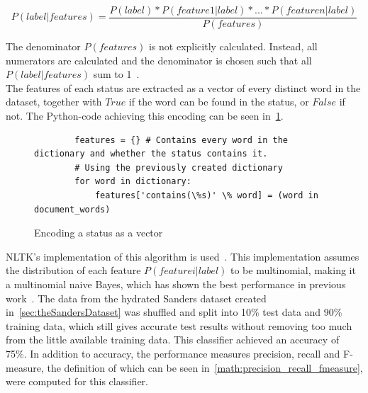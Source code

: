 \begin{equation}
    P(label|features) = \frac{P(label)*P(feature 1|label)*...*P(feature n|label)}{P(features)}
\end{equation}


The denominator $P(features)$ is not explicitly calculated.
Instead, all numerators are calculated and the denominator is chosen such that all $P(label|features)$ sum to 1~\cite{nltkDocs}.
\\
The features of each status are extracted as a vector of every distinct word in the dataset,
together with $True$ if the word can be found in the status, or $False$ if not.
The Python-code achieving this encoding can be seen in~\cref{code:extract_features}.

\begin{figure}
    \caption{Encoding a status as a vector}
    \label{code:extract_features}
    \begin{verbatim}
        features = {} # Contains every word in the dictionary and whether the status contains it.
        # Using the previously created dictionary
        for word in dictionary:
            features['contains(\%s)' \% word] = (word in document_words)
    \end{verbatim}
\end{figure}

NLTK's implementation of this algorithm is used~\cite{nltkDocs}.
This implementation assumes the distribution of each feature $P(feature i|label)$ to be multinomial,
making it a multinomial naive Bayes, which has shown the best performance in previous work~\cite{Go2009}.
The data from the hydrated Sanders dataset created in~\cref{sec:theSandersDataset} was shuffled and split into 10\% test data and 90\% training data,
which still gives accurate test results without removing too much from the little available training data.
This classifier achieved an accuracy of 75\%.
In addition to accuracy, the performance measures precision, recall and F-measure,
the definition of which can be seen in~\cref{math:precision_recall_fmeasure}, were computed for this classifier.


